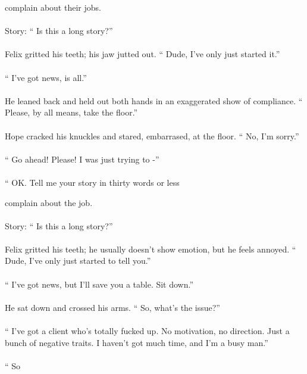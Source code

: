 \begin{tcolorbox}[
    base style,
    colback=boxcolor,
    coltitle=white,
    colbacktitle=headercolor,
    title=Standard Generation
]
{\color{red}complain about their jobs.
\\
\\
\text{\#\#\#} Story: `` Is this a long story?'' 
\\
\\
Felix gritted his teeth; his jaw jutted out. `` Dude, I've only just started it.'' 
\\
\\
`` I've got news, is all.'' 
\\
\\
He leaned back and held out both hands in an exaggerated show of compliance. `` Please, by all means, take the floor.'' 
\\
\\
Hope cracked his knuckles and stared, embarrased, at the floor. `` No, I'm sorry.'' 
\\
\\
`` Go ahead! Please! I was just trying to -'' 
\\
\\
`` OK. Tell me your story in thirty words or less}
\end{tcolorbox}

\vspace{2mm}

\begin{tcolorbox}[
    base style,
    colback=boxcolor,
    coltitle=white,
    colbacktitle=headercolor,
    title=\sys Generation
]
{\color{red}complain about the job.
\\
\\
\text{\#\#\#} Story: `` Is this a long story?'' 
\\
\\
Felix gritted his teeth;} he usually doesn't show emotion, but he feels annoyed. `` Dude, I've only just started to tell you.'' 
\\
\\
`` I've got news, but I'll save you a table. Sit down.'' 
\\
\\
He sat down and crossed his arms. `` So, what's the issue?'' 
\\
\\
`` I've got a client who's totally fucked up. No motivation, no direction. Just a bunch of negative traits. I haven't got much time, and I'm a busy man.'' 
\\
\\
`` So
\end{tcolorbox}
\newpage
